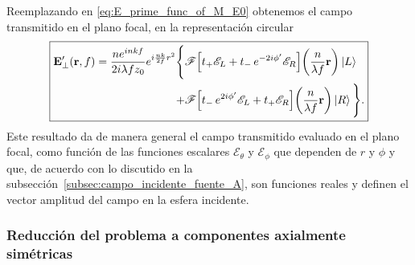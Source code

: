 Reemplazando en \eqref{eq:E_prime_func_of_M_E0} obtenemos el campo transmitido en el plano focal,
en la representación circular
\begin{equation}
\boxed{
\begin{aligned}
\vb{E}'_\perp(\vb r, f)
=
\frac{n e^{inkf}}{2i\lambda f z_0}
e^{i\frac{nk}{2f}r^2}
\Bigg\{
& \mathscr F\!\left[
t_+\mathscr E_L
+
t_-\,e^{-2i\phi'}\mathscr E_R
\right]
\!\left(
\frac{n}{\lambda f}\vb r
\right)
\ket{L}
\\
\qquad\qquad
+
& \mathscr F\!\left[
t_-\,e^{2i\phi'}\mathscr E_L
+
t_+\mathscr E_R
\right]
\!\left(
\frac{n}{\lambda f}\vb r
\right)
\ket{R}
\Bigg\}.
\end{aligned}
}
\label{eq:E_prime_in_circular_representation}
\end{equation}
Este resultado da de manera general el campo transmitido evaluado en el plano focal, como función de las funciones escalares $\mathscr E_\theta$ y $\mathscr E_\phi$ que dependen de $r$ y $\phi$ y que, de acuerdo con lo discutido en la subsección~\ref{subsec:campo_incidente_fuente_A}, son funciones reales y definen el vector amplitud del campo en la esfera incidente.

\subsubsection{Reducción del problema a componentes axialmente simétricas}

